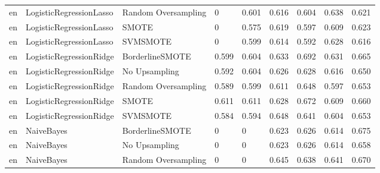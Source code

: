 \begin{tabular}{lllllllll}
      en &      LogisticRegressionLasso & Random Oversampling &         0 &                     0.601 &                 0.616 &                  0.604 &                                   0.638 &     0.621 \\
      en &      LogisticRegressionLasso &               SMOTE &         0 &                     0.575 &                 0.619 &                  0.597 &                                   0.609 &     0.623 \\
      en &      LogisticRegressionLasso &            SVMSMOTE &         0 &                     0.599 &                 0.614 &                  0.592 &                                   0.628 &     0.616 \\
      en &      LogisticRegressionRidge &     BorderlineSMOTE &     0.599 &                     0.604 &                 0.633 &                  0.692 &                                   0.631 &     0.665 \\
      en &      LogisticRegressionRidge &       No Upsampling &     0.592 &                     0.604 &                 0.626 &                  0.628 &                                   0.616 &     0.650 \\
      en &      LogisticRegressionRidge & Random Oversampling &     0.589 &                     0.599 &                 0.611 &                  0.648 &                                   0.597 &     0.653 \\
      en &      LogisticRegressionRidge &               SMOTE &     0.611 &                     0.611 &                 0.628 &                  0.672 &                                   0.609 &     0.660 \\
      en &      LogisticRegressionRidge &            SVMSMOTE &     0.584 &                     0.594 &                 0.648 &                  0.641 &                                   0.604 &     0.653 \\
      en &                   NaiveBayes &     BorderlineSMOTE &         0 &                         0 &                 0.623 &                  0.626 &                                   0.614 &     0.675 \\
      en &                   NaiveBayes &       No Upsampling &         0 &                         0 &                 0.623 &                  0.626 &                                   0.614 &     0.658 \\
      en &                   NaiveBayes & Random Oversampling &         0 &                         0 &                 0.645 &                  0.638 &                                   0.641 &     0.670 \\

\end{tabular}

